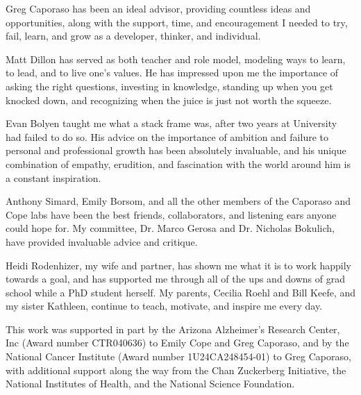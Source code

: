 Greg Caporaso has been an ideal advisor, providing countless ideas
and opportunities, along with the support, time, and encouragement I needed to
try, fail, learn, and grow as a developer, thinker, and individual.

Matt Dillon has served as both teacher and role model, modeling ways to learn,
to lead, and to live one's values. He has impressed upon me the importance of
asking the right questions, investing in knowledge, standing up when you get
knocked down, and recognizing when the juice is just not worth the squeeze.

Evan Bolyen taught me what a stack frame was, after two years at University had
failed to do so. His advice on the importance of ambition and failure to
personal and professional growth has been absolutely invaluable, and his unique
combination of empathy, erudition, and fascination with the world around him is
a constant inspiration.

Anthony Simard, Emily Borsom, and all the other members of the Caporaso and Cope labs have
been the best friends, collaborators, and listening ears anyone could hope for.
My committee, Dr. Marco Gerosa and Dr. Nicholas Bokulich, have provided invaluable
advice and critique.

Heidi Rodenhizer, my wife and partner, has shown me what it is to work happily
towards a goal, and has supported me through all of the ups and downs of grad
school while a PhD student herself. My parents, Cecilia Roehl and Bill Keefe,
and my sister Kathleen, continue to teach, motivate, and inspire me every day.

This work was supported in part by the Arizona Alzheimer’s Research Center, Inc
(Award number CTR040636) to Emily Cope and Greg Caporaso, and by the National
Cancer Institute (Award number 1U24CA248454-01) to Greg Caporaso, with
additional support along the way from the Chan Zuckerberg Initiative, the
National Institutes of Health, and the National Science Foundation.